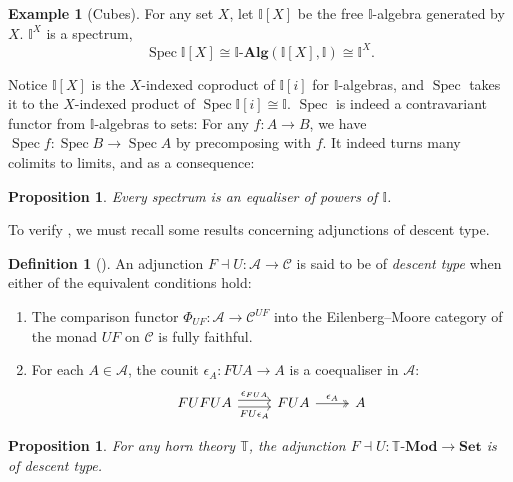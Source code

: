 \documentclass[a4paper,12pt]{amsart}
\newtheorem{proposition}[theorem]{Proposition}
\theoremstyle{definition}
\newtheorem{example}[theorem]{Example}
\newtheorem{definition}[theorem]{Definition}
\newcommand{\mc}[1]{\mathcal{#1}}
\newcommand{\mb}[1]{\mathbf{#1}}
\newcommand{\mbb}[1]{\mathbb{#1}}
\newcommand{\T}{\mbb T}
\newcommand{\I}{\mbb I}
\newcommand{\Set}{\mb{Set}}
\newcommand{\alg}{\text{-}\mb{Alg}}
\newcommand{\mmod}[1]{#1\text{-}\mathbf{Mod}}
\newcommand{\spec}{\operatorname{Spec}}
\begin{document}
\begin{example}[Cubes]\label{exm:cubeaffine}
  For any set $X$, let $\I[X]$ be the free $\I$-algebra generated by $X$. $\I^X$ is a spectrum,
  \[ \spec \I[X] \cong \I\alg(\I[X],\I) \cong \I^X. \]
\end{example}

Notice $\I[X]$ is the $X$-indexed coproduct of $\I[i]$ for $\I$-algebras, and $\spec$ takes it to the $X$-indexed product of $\spec\I[i] \cong \I$. $\spec$ is indeed a contravariant functor from $\I$-algebras to sets: For any $f \colon A \to B$, we have $\spec f \colon \spec B \to \spec A$ by precomposing with $f$. It indeed turns many colimits to limits, and as a consequence:

\begin{proposition}\label{prop:spectra-are-powers-of-the-interval}
  Every spectrum is an equaliser of powers of $\I$. 
\end{proposition}

To verify , we must recall some results concerning adjunctions of descent type.

\begin{definition}[\citet{kelly1993adjunctions}]
  An adjunction $F\dashv U\colon \mathcal{A}\to \mathcal{C}$ is said to be of \emph{descent type} when either of the equivalent conditions hold:
  \begin{enumerate}
    \item The comparison functor $\Phi_{UF}\colon \mc{A} \to \mc{C}^{UF}$ into the Eilenberg--Moore category of the monad $UF$ on $\mathcal{C}$ is fully faithful.
    \item For each $A\in \mc{A}$, the counit $\epsilon_A\colon FUA\to A$ is a coequaliser in $\mc{A}$:
    \[\begin{tikzcd}
      FUFUA \ar[r, shift left, "\epsilon_{FUA}"] \ar[r, shift right, "{FU\epsilon_A}"'] & FUA \ar[r, two heads, "\epsilon_{A}"] & A
    \end{tikzcd}\]  
  \end{enumerate}
\end{definition}


\begin{proposition}\label{lem:horn-free-models-descent}
  For any horn theory $\T$, the adjunction $F\dashv U\colon \mmod\T\to\Set$ is of descent type.
\end{proposition}
\end{document}
